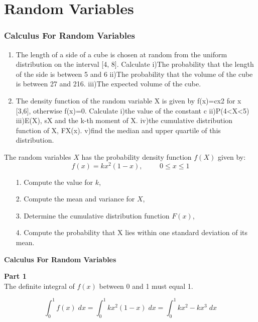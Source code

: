 	\chapter{Random Variables}

			\subsection{Calculus For Random Variables}
			
			\begin{enumerate}
				\item The length of a side of a cube is chosen at random from the uniform distribution on the interval [4, 8]. Calculate
				i)The probability that the length of the side is between 5 and 6
				ii)The probability that the volume of the cube is between 27 and 216.
				iii)The expected volume of the cube.
				
				\item The density function of the random variable X is given by f(x)=cx2 for x [3,6], otherwise f(x)=0. Calculate
				i)the value of the constant c
				ii)P(4<X<5)
				iii)E(X), sX and the k-th moment of X.
				iv)the cumulative distribution function of X, FX(x).
				v)find the median and upper quartile of this distribution.
				
			\end{enumerate}
			
			
			The random variables $X$ has the probability density function $f(X)$ given by:
			\[ f(x) = kx^2(1-x), \phantom{space} 0 \leq x \leq 1 \]
			
			\begin{itemize}
				\item[1.] Compute the value for $k$,
				\item[2.] Compute the mean and variance for $X$,
				\item[3.] Determine the cumulative distribution function $F(x)$,
				\item[4.] Compute the probability that X lies within one standard deviation of its mean.
			\end{itemize}
			
			
			\noindent \textbf{Calculus For Random Variables}
			
			\textbf{Part 1}\\
			The definite integral of $f(x)$ between 0 and 1 must equal 1.
			
			\[ \int^1_0 f(x)\;dx = \int^1_0 kx^2(1-x)\;dx = \int^1_0 kx^2-kx^3\;dx  \]
			

